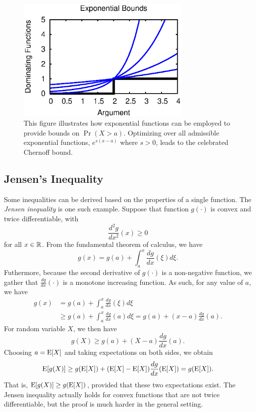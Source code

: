 \begin{figure}[ht]
\begin{center}
\includegraphics[width=8.5cm]{Figures/10chapter/chernoff_bound}
\end{center}
\caption{This figure illustrates how exponential functions can be employed to provide bounds on $\Pr (X > a)$.
Optimizing over all admissible exponential functions, $e^{s(x-a)}$ where $s > 0$, leads to the celebrated Chernoff bound.}
\label{figure:ChernoffBound}
\end{figure}


\subsection{Jensen's Inequality}

Some inequalities can be derived based on the properties of a single function.
The \emph{Jensen inequality} is one such example. 
Suppose that function $g(\cdot)$ is convex and twice differentiable, with
\begin{equation*}
\frac{d^2 g}{dx^2} (x) \geq 0
\end{equation*}
for all $x \in \mathbb{R}$.
From the fundamental theorem of calculus, we have
\begin{equation*}
g(x) = g(a) + \int_a^x \frac{dg}{dx} (\xi) d\xi .
\end{equation*}
Futhermore, because the second derivative of $g(\cdot)$ is a non-negative function, we gather that $\frac{dg}{dx} (\cdot)$ is a monotone increasing function.
As such, for any value of $a$, we have
\begin{equation*}
\begin{split}
g(x) &= g(a) + \int_a^x \frac{dg}{dx} (\xi) d\xi \\
&\geq g(a) + \int_a^x \frac{dg}{dx} (a) d\xi
= g(a) + (x-a) \frac{dg}{dx} (a) .
\end{split}
\end{equation*}
For random variable $X$, we then have
\begin{equation*}
g(X) \geq g(a) + (X-a) \frac{dg}{dx} (a) .
\end{equation*}
Choosing $a = \mathrm{E} [X]$ and taking expectations on both sides, we obtain
\begin{equation*}
\mathrm{E} [g(X)] \geq g(\mathrm{E} [X])
+ (\mathrm{E} [X]-\mathrm{E} [X]) \frac{dg}{dx} (\mathrm{E} [X])
= g(\mathrm{E} [X]) .
\end{equation*}
That is, $\mathrm{E} [g(X)] \geq g(\mathrm{E} [X])$, provided that these two expectations exist.
The Jensen inequality actually holds for convex functions that are not twice differentiable, but the proof is much harder in the general setting.


